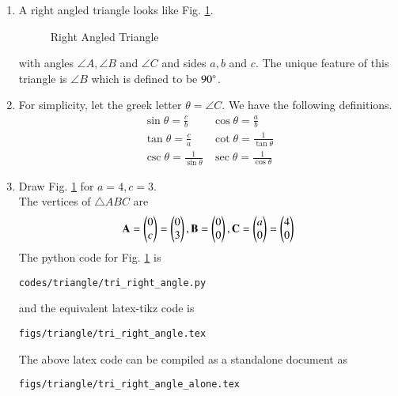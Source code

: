\renewcommand{\theequation}{\theenumi}
\begin{enumerate}[label=\arabic*.,ref=\thesubsection.\theenumi]
\item


A right angled triangle looks like Fig. \ref{fig:tri_right_angle}.
\begin{figure}[!ht]
\centering
\resizebox{\columnwidth}{!}{}
\caption{Right Angled Triangle}
\label{fig:tri_right_angle}	
\end{figure}
with angles $\angle A,\angle B$ and $\angle C$ and sides $a, b$ and $c$.  The unique feature of this triangle is $\angle B$ which is defined to be $90\degree$.
\item
	For simplicity, let the greek letter $\theta = \angle C$.  We have the following definitions.
\begin{equation}
\label{eq:tri_trig_defs}
\begin{matrix}
	\sin \theta = \frac{c}{b} & 	\cos \theta = \frac{a}{b} \\
	\tan \theta = \frac{c}{a} & \cot \theta = \frac{1}{\tan \theta} \\
	\csc \theta = \frac{1}{\sin \theta} & \sec \theta = \frac{1}{\cos \theta}
	\end{matrix}
\end{equation}
%
\item Draw Fig. \ref{fig:tri_right_angle} for $a = 4, c =3$.
\label{const:tri_right_angle}
%
\\
\solution The vertices of $\triangle ABC$ are 
\begin{align}
\mathbf{A} = \begin{pmatrix}0\\c\end{pmatrix} = \begin{pmatrix}0\\3\end{pmatrix}, \mathbf{B} = \begin{pmatrix}0\\0\end{pmatrix}, \mathbf{C} = \begin{pmatrix}a\\0\end{pmatrix}=\begin{pmatrix}4\\0\end{pmatrix}
\end{align}
%
The python code for  Fig. \ref{fig:tri_right_angle} is
\begin{lstlisting}
codes/triangle/tri_right_angle.py
\end{lstlisting}
%
and the equivalent latex-tikz code is
%
\begin{lstlisting}
figs/triangle/tri_right_angle.tex
\end{lstlisting}
%
The above latex code can be compiled as a standalone document as
%
\begin{lstlisting}
figs/triangle/tri_right_angle_alone.tex
\end{lstlisting}
%


\end{enumerate}
